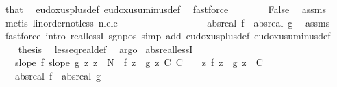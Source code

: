 \begin{isabellebody}
\ that\ \isamarkupfalse%
\ eudoxus{\isacharunderscore}{\kern0pt}plus{\isacharunderscore}{\kern0pt}def\ eudoxus{\isacharunderscore}{\kern0pt}uminus{\isacharunderscore}{\kern0pt}def\ \isamarkupfalse%
\ fastforce\isanewline
\ \ \ \ \ \ \isamarkupfalse%
\ False\ \isamarkupfalse%
\ assms\ \isamarkupfalse%
\ {\isacharparenleft}{\kern0pt}metis\ linorder{\isacharunderscore}{\kern0pt}not{\isacharunderscore}{\kern0pt}less\ nle{\isacharunderscore}{\kern0pt}le{\isacharparenright}{\kern0pt}\ \ \ \ \ \ \isanewline
\ \ \ \ \isacommand{{\isacharbraceright}{\kern0pt}}\isamarkupfalse%
\isanewline
\ \ \ \ \isamarkupfalse%
\ \isamarkupfalse%
\ {\isachardoublequoteopen}abs{\isacharunderscore}{\kern0pt}real\ f\ {\isachargreater}{\kern0pt}\ abs{\isacharunderscore}{\kern0pt}real\ g{\isachardoublequoteclose}\ \isamarkupfalse%
\ assms\ \isamarkupfalse%
\ {\isacharparenleft}{\kern0pt}fastforce\ intro{\isacharcolon}{\kern0pt}\ real{\isacharunderscore}{\kern0pt}lessI\ sgn{\isacharunderscore}{\kern0pt}pos\ simp\ add{\isacharcolon}{\kern0pt}\ eudoxus{\isacharunderscore}{\kern0pt}plus{\isacharunderscore}{\kern0pt}def\ eudoxus{\isacharunderscore}{\kern0pt}uminus{\isacharunderscore}{\kern0pt}def{\isacharparenright}{\kern0pt}\isanewline
\ \ \isacommand{{\isacharbraceright}{\kern0pt}}\isamarkupfalse%
\isanewline
\ \ \isamarkupfalse%
\ {\isacharquery}{\kern0pt}thesis\ \isamarkupfalse%
\ less{\isacharunderscore}{\kern0pt}eq{\isacharunderscore}{\kern0pt}real{\isacharunderscore}{\kern0pt}def\ \isamarkupfalse%
\ argo\isanewline
{}\isamarkupfalse%
%
\endisatagproof
{\isafoldproof}%
%
\isadelimproof
\isanewline
%
\endisadelimproof
\isanewline
{}\isamarkupfalse%
\ abs{\isacharunderscore}{\kern0pt}real{\isacharunderscore}{\kern0pt}lessI{\isacharcolon}{\kern0pt}\isanewline
\ \ \ {\isachardoublequoteopen}slope\ f{\isachardoublequoteclose}\ {\isachardoublequoteopen}slope\ g{\isachardoublequoteclose}\ {\isachardoublequoteopen}{\isasymAnd}z{\isachardot}{\kern0pt}\ z\ {\isasymge}\ N\ {\isasymLongrightarrow}\ f\ z\ {\isasymge}\ g\ z{\isachardoublequoteclose}\ {\isachardoublequoteopen}{\isasymAnd}C{\isachardot}{\kern0pt}\ C\ {\isasymge}\ {}\ {\isasymLongrightarrow}\ {\isasymexists}z{\isachardot}{\kern0pt}\ f\ z\ {\isasymge}\ g\ z\ {\isacharplus}{\kern0pt}\ C{\isachardoublequoteclose}\isanewline
\ \ \ {\isachardoublequoteopen}abs{\isacharunderscore}{\kern0pt}real\ f\ {\isachargreater}{\kern0pt}\ abs{\isacharunderscore}{\kern0pt}real\ g{\isachardoublequoteclose}\isanewline

\end{isabellebody}
